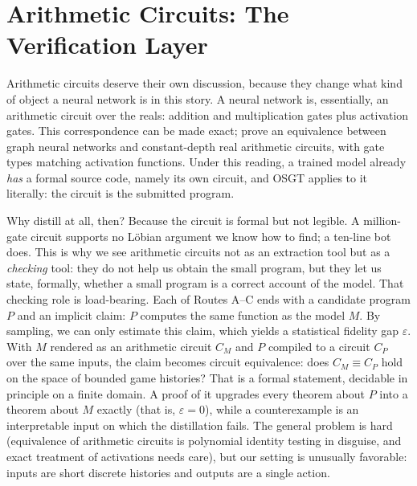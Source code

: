 \documentclass{article}
\begin{document}
\section{Arithmetic Circuits: The Verification Layer}
Arithmetic circuits deserve their own discussion, because they change what kind of object a neural network is in this story. A neural network is, essentially, an arithmetic circuit over the reals: addition and multiplication gates plus activation gates. This correspondence can be made exact; \textcite{barlag2024gnnarithmeticcircuits} prove an equivalence between graph neural networks and constant-depth real arithmetic circuits, with gate types matching activation functions. Under this reading, a trained model already \emph{has} a formal source code, namely its own circuit, and OSGT applies to it literally: the circuit is the submitted program.

Why distill at all, then? Because the circuit is formal but not legible. A million-gate circuit supports no Löbian argument we know how to find; a ten-line bot does. This is why we see arithmetic circuits not as an extraction tool but as a \emph{checking} tool: they do not help us obtain the small program, but they let us state, formally, whether a small program is a correct account of the model. That checking role is load-bearing. Each of Routes A--C ends with a candidate program $P$ and an implicit claim: $P$ computes the same function as the model $M$. By sampling, we can only estimate this claim, which yields a statistical fidelity gap $\varepsilon$. With $M$ rendered as an arithmetic circuit $C_M$ and $P$ compiled to a circuit $C_P$ over the same inputs, the claim becomes circuit equivalence: does $C_M \equiv C_P$ hold on the space of bounded game histories? That is a formal statement, decidable in principle on a finite domain. A proof of it upgrades every theorem about $P$ into a theorem about $M$ exactly (that is, $\varepsilon = 0$), while a counterexample is an interpretable input on which the distillation fails. The general problem is hard (equivalence of arithmetic circuits is polynomial identity testing in disguise, and exact treatment of activations needs care), but our setting is unusually favorable: inputs are short discrete histories and outputs are a single action.

\printbibliography
\end{document}
